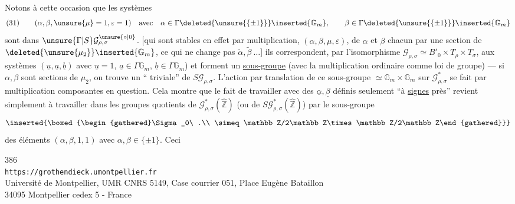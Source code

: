 Notons à cette occasion que les systèmes
\[
(31)\qquad
(\alpha,\beta,\unsure{\mu}=1,\varepsilon=1)
\quad\text{avec}\quad
\alpha\in\Gamma\deleted{\unsure{\{\pm1\}}}\inserted{\mathbb G_m},\qquad
\beta\in\Gamma\deleted{\unsure{\{\pm1\}}}\inserted{\mathbb G_m}
\]
sont dans $\unsure{\Gamma|S}\mathcal G_{\rho,\sigma}^{\unsure{\circ|0}}$.
[qui sont stables en effet par multiplication,  $(\alpha,\beta,\mu,\varepsilon)$, de $\alpha$ et $\beta$ chacun par une section de $\deleted{\unsure{\mu_2}}\inserted{\mathbb G_m}$, ce qui ne change pas $\widetilde\alpha,\widetilde\beta\ \ldots$]
ils correspondent, par l'isomorphisme $\mathcal G_{\rho,\sigma}\simeq B'_0\times T_\rho\times T_\sigma$, aux systèmes $(\underline u,\underline a,\underline b)$ avec $\underline u=1$, $\underline a\in\Gamma\mathbb G_m$, $\underline b\in\Gamma\mathbb G_m$) et forment un \uline{sous-groupe} (avec la multiplication ordinaire    comme loi de groupe) --- si $\alpha,\beta$ sont sections de $\mu_2$, on trouve un   `` triviale''  de $S\mathcal G_{\rho,\sigma}$.
L'action par translation de ce sous-groupe $\simeq\mathbb G_m\times\mathbb G_m$ sur $\mathcal G_{\rho,\sigma}^{*}$ se fait par multiplication    composantes en question. Cela montre que le fait de travailler avec des $\underline\alpha,\underline\beta$ définis seulement ``à \uline{signes} près'' revient simplement à travailler dans les groupes quotients de \uline{$\mathcal G_{\rho,\sigma}^{*}(\widehat{\mathbb Z})$} (ou de $S\mathcal G_{\rho,\sigma}^{*}(\widehat{\mathbb Z})$) par le sous-groupe
\[
\inserted{\boxed{\begin{gathered}\Sigma_0\ .\\ \simeq\mathbb Z/2\mathbb Z\times\mathbb Z/2\mathbb Z\end{gathered}}}
\]
 des éléments $(\alpha,\beta,1,1)$ avec $\alpha,\beta\in\{\pm1\}$. Ceci

\begin{center}
386\\
\texttt{https://grothendieck.umontpellier.fr}\\
Université de Montpellier, UMR CNRS 5149, Case courrier 051, Place Eugène Bataillon\\
34095 Montpellier cedex 5 - France
\end{center}

